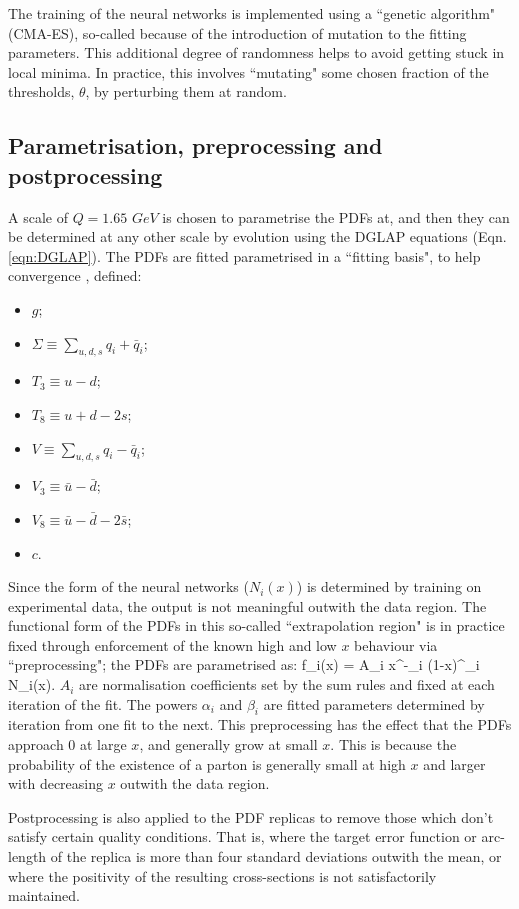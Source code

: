 The training of the neural networks is implemented using a ``genetic algorithm" (CMA-ES), so-called because of the introduction of mutation to the fitting parameters. This additional degree of randomness helps to avoid getting stuck in local minima. In practice, this involves ``mutating" some chosen fraction of the thresholds, $\theta$, by perturbing them at random.

\subsection{Parametrisation, preprocessing and postprocessing}
A scale of $Q=1.65$ $GeV$ is chosen to parametrise the PDFs at, and then they can be determined at any other scale by evolution using the DGLAP equations (Eqn. \ref{eqn:DGLAP}). The PDFs are fitted parametrised in a ``fitting basis", to help convergence \cite{Ball:2014uwa}, defined:
\begin{itemize}
\item $g$;
\item $\Sigma \equiv \sum_{u,d,s} q_i + \bar{q}_i$;
\item $T_3 \equiv u - d$;
\item $T_8 \equiv u + d - 2s$;
\item $V \equiv \sum_{u, d, s} q_i - \bar{q}_i$;
\item $V_3 \equiv \bar{u} - \bar{d}$;
\item $V_8 \equiv \bar{u} - \bar{d} - 2 \bar{s}$;
\item $c$.
\end{itemize}
Since the form of the neural networks ($N_i(x)$) is determined by training on experimental data, the output is not meaningful outwith the data region. The functional form of the PDFs in this so-called ``extrapolation region" is in practice fixed through enforcement of the known high and low $x$ behaviour via ``preprocessing"; the PDFs are parametrised as:
\beq
  f_i(x) = A_i x^{-\alpha_i} (1-x)^{\beta_i} N_i(x).
\eeq
$A_i$ are normalisation coefficients set by the sum rules and fixed at each iteration of the fit. The powers $\alpha_i$ and $\beta_i$ are fitted parameters determined by iteration from one fit to the next. This preprocessing has the effect that the PDFs approach 0 at large $x$, and generally grow at small $x$. This is because the probability of the existence of a parton is generally small at high $x$ and larger with decreasing $x$ outwith the data region.

Postprocessing is also applied to the PDF replicas to remove those which don't satisfy certain quality conditions. That is, where the target error function or arc-length of the replica is more than four standard deviations outwith the mean, or where the positivity of the resulting cross-sections is not satisfactorily maintained. 

